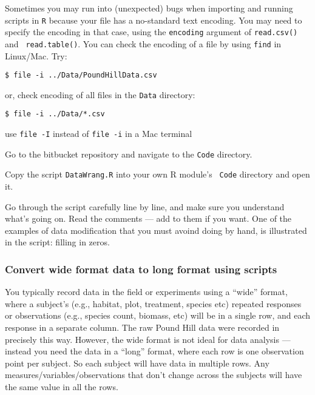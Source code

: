 \begin{tipbox}
Sometimes you may run into (unexpected) bugs when importing and 
running scripts in {\tt R} because your file has a 
no-standard text encoding. You may need to specify the encoding in that 
case, using the {\tt encoding} argument of {\tt read.csv()} and {\tt 
read.table()}. You can check the encoding of a file by using {\tt find} in 
Linux/Mac. Try:
\begin{lstlisting}
$ file -i ../Data/PoundHillData.csv
\end{lstlisting}
or, check encoding of all files in the {\tt Data} directory: 
\begin{lstlisting}
$ file -i ../Data/*.csv 	
\end{lstlisting}
use {\tt file -I} instead of {\tt file -i} in a Mac terminal
\end{tipbox} 

\begin{compactitem}[$\quad\star$]
	\item Go to the bitbucket repository and navigate to the {\tt Code} 
	directory. 
	\item Copy the script {\tt DataWrang.R} into your own R module's {\tt 
	Code} directory and open it. 
\end{compactitem}

Go through the script carefully line by line, and make sure you 
understand what's going on. Read the comments --- add to them if you 
want. One of the examples of data modification that you must avoind 
doing by hand, is illustrated in the script: filling in zeros.  

\subsubsection{Convert wide format data to long format using scripts}

You typically record data in the field or experiments using a ``wide'' 
format, where a subject's (e.g., habitat, plot, treatment, species etc) 
repeated responses or observations (e.g., species count, biomass, etc) 
will be in a single row, and each response in a separate column. The 
raw Pound Hill data were recorded in precisely this way. However, the 
wide format is not ideal for data analysis --- instead you need the 
data in a ``long'' format, where each row is one observation point per 
subject. So each subject will have data in multiple rows. Any 
measures/variables/observations that don't change across the subjects 
will have the same value in all the rows.

